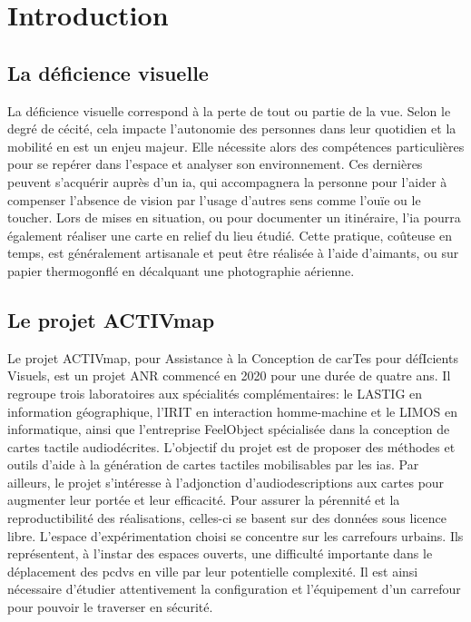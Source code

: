 \chapter*{Introduction}



\section*{La déficience visuelle}

La déficience visuelle correspond à la perte de tout ou partie de la vue. Selon le degré de cécité, cela impacte l’autonomie des personnes dans leur quotidien et la mobilité en est un enjeu majeur. Elle nécessite alors des compétences particulières pour se repérer dans l'espace et analyser son environnement. Ces dernières peuvent s'acquérir auprès d'un \gls{ia}, qui accompagnera la personne pour l'aider à compenser l'absence de vision par l'usage d'autres sens comme l'ouïe ou le toucher. Lors de mises en situation, ou pour documenter un itinéraire, l'\gls{ia} pourra également réaliser une carte en relief du lieu étudié. Cette pratique, coûteuse en temps, est généralement artisanale et peut être réalisée à l'aide d'aimants, ou sur papier thermogonflé en décalquant une photographie aérienne.


\section*{Le projet ACTIVmap}

Le projet ACTIVmap, pour Assistance à la Conception de carTes pour défIcients Visuels, est un projet ANR commencé en 2020 pour une durée de quatre ans. Il regroupe trois laboratoires aux spécialités complémentaires: le LASTIG en information géographique, l'IRIT en interaction homme-machine et le LIMOS en informatique, ainsi que l'entreprise FeelObject spécialisée dans la conception de cartes tactile audiodécrites. L'objectif du projet est de proposer des méthodes et outils d'aide à la génération de cartes tactiles mobilisables par les \glspl{ia}. Par ailleurs, le projet s'intéresse à l'adjonction d'audiodescriptions aux cartes pour augmenter leur portée et leur efficacité. Pour assurer la pérennité et la reproductibilité des réalisations, celles-ci se basent sur des données sous licence libre. L'espace d'expérimentation choisi se concentre sur les carrefours urbains. Ils représentent, à l'instar des espaces ouverts, une difficulté importante dans le déplacement des \glspl{pcdv} en ville par leur potentielle complexité. Il est ainsi nécessaire d'étudier attentivement la configuration et l'équipement d'un carrefour pour pouvoir le traverser en sécurité.

